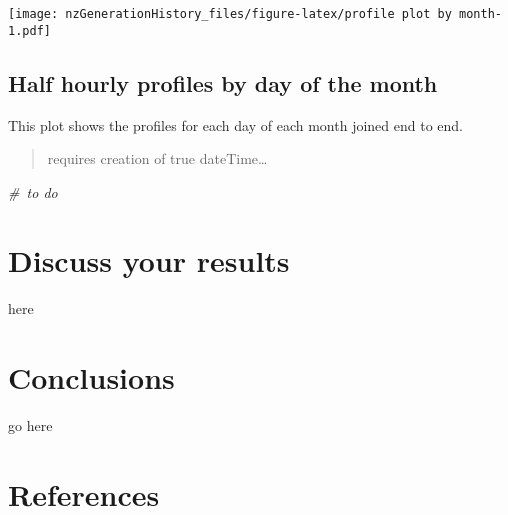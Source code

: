 \documentclass[]{article}
\newenvironment{Shaded}{\begin{snugshade}}{\end{snugshade}}
\newcommand{\CommentTok}[1]{\textcolor[rgb]{0.56,0.35,0.01}{\textit{#1}}}
\begin{document}
\texttt{[image: nzGenerationHistory\_files/figure-latex/profile plot by month-1.pdf]}

\subsection{Half hourly profiles by day of the
month}\label{half-hourly-profiles-by-day-of-the-month}

This plot shows the profiles for each day of each month joined end to
end.

\begin{quote}
requires creation of true dateTime\ldots{}
\end{quote}

\begin{Shaded}
\begin{Highlighting}[]
\CommentTok{# to do}
\end{Highlighting}
\end{Shaded}

\section{Discuss your results}\label{discuss-your-results}

here

\section{Conclusions}\label{conclusions}

go here

\section{References}\label{references}
\end{document}
